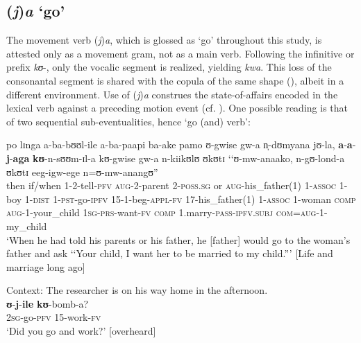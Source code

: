 \subsection{(\textit{\textit{j}})\textit{\textit{a}} `go'}\label{jaAspectualizer}
The movement verb (\textit{j})\textit{a}, which is glossed as `go' throughout this study, is  attested only as a movement gram, not as a main verb. Following the infinitive or  prefix \textit{kʊ}-, only the vocalic segment is realized, yielding \textit{kwa}. This loss of the consonantal segment is shared with the copula of the same shape (), albeit in a different environment. Use of (\textit{j})\textit{a} construes the state-of-affairs encoded in the lexical verb against a preceding motion event (cf. \citealt[251]{WilkinsD1991}). One possible reading is that of two sequential sub-eventualities, hence \lq go (and) verb':

\begin{exe}
\ex \gll po lɪnga a-ba-bʊʊl-ile a-ba-paapi ba-ake pamo ʊ-gwise gw-a n̩-dʊmyana jʊ-la, \textbf{a}-\textbf{a}-\textbf{j}-\textbf{aga} \textbf{kʊ}-n-sʊʊm-ɪl-a kʊ-gwise gw-a n-kiikʊlʊ ʊkʊtɪ \textup{\lq\lq}ʊ-mw-anaako, n-gʊ-lond-a ʊkʊtɪ eeg-igw-ege n=ʊ-mw-anangʊ\textup{''}\\
then if/when 1-2-tell-\textsc{pfv} \textsc{aug}-2-parent 2-\textsc{poss.sg} or \textsc{aug}-his\_father(1) 1-\textsc{assoc} 1-boy 1-\textsc{dist} 1-\textsc{pst}-go-\textsc{ipfv} 15-1-beg-\textsc{appl}-\textsc{fv} 17-his\_father(1) 1-\textsc{assoc} 1-woman \textsc{comp} \phantom{\lq\lq}\textsc{aug}-1-your\_child \textsc{1sg}-\textsc{prs}-want-\textsc{fv} \textsc{comp} 1.marry-\textsc{pass}-\textsc{ipfv.subj} \textsc{com}=\textsc{aug}-1-my\_child\\
\glt \lq When he had told his parents or his father, he [father] would go to the woman's father and ask \lq\lq Your child, I want her to be married to my child.''{}' [Life and marriage long ago]

\ex Context: The researcher is on his way home in the afternoon.\\
\gll \textbf{ʊ}-\textbf{j}-\textbf{ile} \textbf{kʊ}-bomb-a?\\
\textsc{2sg}-go-\textsc{pfv} 15-work-\textsc{fv}\\
\glt \lq Did you go and work?' [overheard]
\end{exe}

